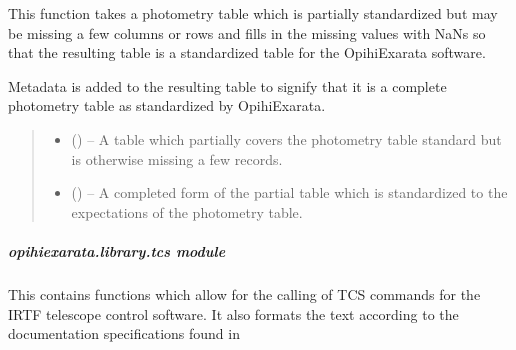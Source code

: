 \documentclass[letterpaper,11pt,english]{sphinxmanual}
\begin{document}
\begin{savenotes}\begin{fulllineitems}
\label{\detokenize{code/opihiexarata.library.phototable:opihiexarata.library.phototable.fill_incomplete_photometry_table}}
\pysigstartsignatures
{}
\pysigstopsignatures
\sphinxAtStartPar
This function takes a photometry table which is partially standardized
but may be missing a few columns or rows and fills in the missing values
with NaNs so that the resulting table is a standardized table for the
OpihiExarata software.

\sphinxAtStartPar
Metadata is added to the resulting table to signify that it is a complete
photometry table as standardized by OpihiExarata.
\begin{quote}\begin{description}
\begin{itemize}
\item {} 
\sphinxAtStartPar
{} () – A table which partially covers the photometry table standard but is
otherwise missing a few records.

\item {} 
\sphinxAtStartPar
{} () – A completed form of the partial table which is standardized to the
expectations of the photometry table.

\end{itemize}

\end{description}\end{quote}

\end{fulllineitems}\end{savenotes}


\sphinxstepscope


\subparagraph{opihiexarata.library.tcs module}
\label{\detokenize{code/opihiexarata.library.tcs:module-opihiexarata.library.tcs}}\label{\detokenize{code/opihiexarata.library.tcs:opihiexarata-library-tcs-module}}\label{\detokenize{code/opihiexarata.library.tcs::doc}}
\sphinxAtStartPar
This contains functions which allow for the calling of TCS commands for
the IRTF telescope control software. It also formats the text according to
the documentation specifications found in
\end{document}
